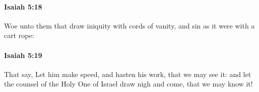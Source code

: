 		\paragraph{Isaiah 5:18} %
			\label{ISAIAH-5-18}

			Woe unto them that draw iniquity with cords of vanity, and sin as it were with a cart rope:


		\paragraph{Isaiah 5:19} %
			\label{ISAIAH-5-19}

			That say, Let him make speed, and hasten his work, that we may see it: and let the counsel of the Holy One of Israel draw nigh and come, that we may know it!



